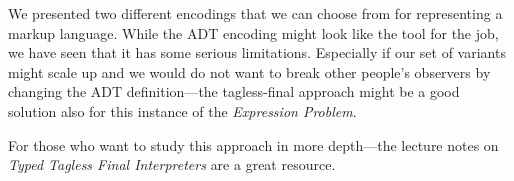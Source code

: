 We presented two different encodings that we can choose from for representing a
markup language. While the ADT encoding might look like the tool for the job, we
have seen that it has some serious limitations. Especially if our set of
variants might scale up and we would do not want to break other people's
observers by changing the ADT definition—the tagless-final approach might be a
good solution also for this instance of the \emph{Expression Problem}.

For those who want to study this approach in more depth—the lecture notes on
\emph{Typed Tagless Final Interpreters} \cite{finally-tagless-tut} are a great
resource.
